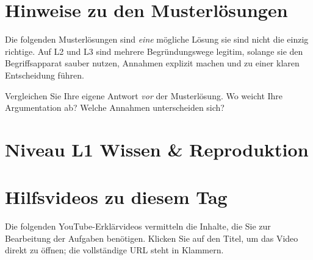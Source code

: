 \documentclass[11pt,a4paper,oneside]{article}
\begin{document}
\section*{Hinweise zu den Musterlösungen}
\thispagestyle{plain}

\noindent Die folgenden Musterlösungen sind \emph{eine} mögliche Lösung \textendash{} sie sind nicht die einzig richtige. Auf L2 und L3 sind mehrere Begründungswege legitim, solange sie den Begriffsapparat sauber nutzen, Annahmen explizit machen und zu einer klaren Entscheidung führen.

\begin{infobox}
Vergleichen Sie Ihre eigene Antwort \emph{vor} der Musterlösung. Wo weicht Ihre Argumentation ab? Welche Annahmen unterscheiden sich?
\end{infobox}

\clearpage

\section*{Niveau L1 \textendash{} Wissen \& Reproduktion}

\section*{Hilfsvideos zu diesem Tag}
\thispagestyle{plain}

\noindent Die folgenden YouTube-Erkl\"arvideos vermitteln die Inhalte, die Sie zur Bearbeitung der Aufgaben ben\"otigen. Klicken Sie auf den Titel, um das Video direkt zu \"offnen; die vollst\"andige URL steht in Klammern.
\end{document}
